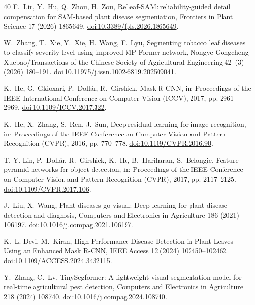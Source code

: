 \documentclass[5p,times]{elsarticle}
\begin{document}
\begin{thebibliography}{40}
F.~Liu, Y.~Hu, Q.~Zhou, H.~Zou, ReLeaf-SAM: reliability-guided detail
  compensation for SAM-based plant disease segmentation, Frontiers in Plant
  Science 17 (2026) 1865649. \href{https://doi.org/10.3389/fpls.2026.1865649}{doi:10.3389/fpls.2026.1865649}.

W.~Zhang, T.~Xie, Y.~Xie, H.~Wang, F.~Lyu, Segmenting tobacco leaf diseases to
  classify severity level using improved MP-Former network, Nongye Gongcheng
  Xuebao/Transactions of the Chinese Society of Agricultural Engineering 42~(3)
  (2026) 180--191. \href{https://doi.org/10.11975/j.issn.1002-6819.202509041}{doi:10.11975/j.issn.1002-6819.202509041}.

K.~He, G.~Gkioxari, P.~Doll{\'a}r, R.~Girshick, Mask R-CNN, in: Proceedings of
  the IEEE International Conference on Computer Vision (ICCV), 2017, pp.
  2961--2969. \href{https://doi.org/10.1109/ICCV.2017.322}{doi:10.1109/ICCV.2017.322}.

K.~He, X.~Zhang, S.~Ren, J.~Sun, Deep residual learning for image recognition,
  in: Proceedings of the IEEE Conference on Computer Vision and Pattern
  Recognition (CVPR), 2016, pp. 770--778. \href{https://doi.org/10.1109/CVPR.2016.90}{doi:10.1109/CVPR.2016.90}.

T.-Y. Lin, P.~Doll{\'a}r, R.~Girshick, K.~He, B.~Hariharan, S.~Belongie,
  Feature pyramid networks for object detection, in: Proceedings of the IEEE
  Conference on Computer Vision and Pattern Recognition (CVPR), 2017, pp.
  2117--2125. \href{https://doi.org/10.1109/CVPR.2017.106}{doi:10.1109/CVPR.2017.106}.

J.~Liu, X.~Wang, Plant diseases go visual: Deep learning for plant disease
  detection and diagnosis, Computers and Electronics in Agriculture 186 (2021)
  106197. \href{https://doi.org/10.1016/j.compag.2021.106197}{doi:10.1016/j.compag.2021.106197}.

K.~L. Devi, M.~Kiran, High-Performance Disease Detection in Plant Leaves Using
  an Enhanced Mask R-CNN, IEEE Access 12 (2024) 102450--102462. \href{https://doi.org/10.1109/ACCESS.2024.3432115}{doi:10.1109/ACCESS.2024.3432115}.

Y.~Zhang, C.~Lv, TinySegformer: A lightweight visual segmentation model for
  real-time agricultural pest detection, Computers and Electronics in
  Agriculture 218 (2024) 108740. \href{https://doi.org/10.1016/j.compag.2024.108740}{doi:10.1016/j.compag.2024.108740}.


\end{thebibliography}
\end{document}
